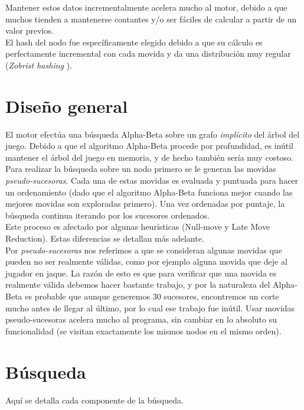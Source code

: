 \documentclass{article}
\begin{document}
\begin{multicols}{2}
Mantener estos datos incrementalmente acelera mucho al motor, debido
a que muchos tienden a mantenerse contantes y/o ser fáciles de calcular
a partir de un valor previos.
\\

El hash del nodo fue específicamente elegido debido a que su cálculo
es perfectamente incremental con cada movida y da una distribución muy
regular (\emph{Zobrist hashing} \cite{wiki:zobrist}).

\section{Diseño general}

El motor efectúa una búsqueda Alpha-Beta sobre un grafo \emph{implícito}
del árbol del juego. Debido a que el algoritmo Alpha-Beta procede
por profundidad, es inútil mantener el árbol del juego en memoria, y
de hecho también sería muy costoso.
\\

Para realizar la búsqueda sobre un nodo primero se le generan las
movidas \emph{pseudo-sucesoras}. Cada una de estas movidas es evaluada
y puntuada para hacer un ordenamiento (dado que el algoritmo Alpha-Beta
funciona mejor cuando las mejores movidas son exploradas primero).
Una vez ordenadas por puntaje, la búsqueda continua iterando por los
sucesores ordenados.
\\

Este proceso es afectado por algunas heurísticas (Null-move y Late Move
Reduction). Estas diferencias se detallan más adelante.
\\

Por \emph{pseudo-sucesoras} nos referimos a que se consideran algunas
movidas que pueden no ser realmente válidas, como por ejemplo
alguna movida que deje al jugador en jaque. La razón de esto es que
para verificar que una movida es realmente válida debemos hacer
bastante trabajo, y por la naturaleza del Alpha-Beta es probable que
aunque generemos 30 sucesores, encontremos un corte mucho antes de
llegar al último, por lo cual ese trabajo fue inútil. Usar movidas
pseudo-sucesoras acelera mucho al programa, sin cambiar en lo absoluto
su funcionalidad (se visitan exactamente los mismos nodos en el mismo
orden).
\\

\section{Búsqueda}
Aquí se detalla cada componente de la búsqueda.


\end{multicols}
\end{document}
